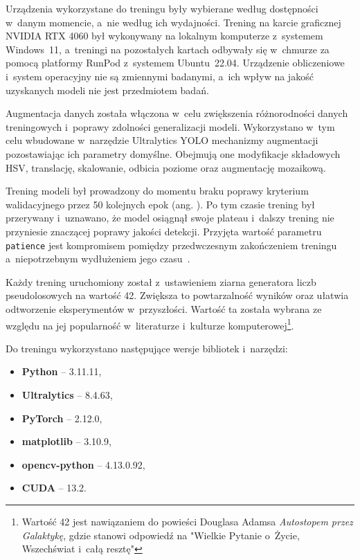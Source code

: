 Urządzenia wykorzystane do treningu były wybierane według dostępności w~danym momencie, a~nie według ich wydajności. Trening na karcie graficznej NVIDIA RTX 4060 był wykonywany na lokalnym komputerze z~systemem Windows~11, a~treningi na pozostałych kartach odbywały się w~chmurze za pomocą platformy RunPod z~systemem Ubuntu~22.04. Urządzenie obliczeniowe i~system operacyjny nie są zmiennymi badanymi, a~ich wpływ na jakość uzyskanych modeli nie jest przedmiotem badań.

Augmentacja danych została włączona w~celu zwiększenia różnorodności danych treningowych i~poprawy zdolności generalizacji modeli. Wykorzystano w~tym celu wbudowane w~narzędzie Ultralytics YOLO mechanizmy augmentacji pozostawiając ich parametry domyślne. Obejmują one modyfikacje składowych HSV, translację, skalowanie, odbicia poziome oraz augmentację mozaikową.

Trening modeli był prowadzony do momentu braku poprawy kryterium walidacyjnego przez 50 kolejnych epok (ang. ). Po tym czasie trening był przerywany i~uznawano, że model osiągnął swoje plateau i~dalszy trening nie przyniesie znaczącej poprawy jakości detekcji. Przyjęta wartość parametru \texttt{patience} jest kompromisem pomiędzy przedwczesnym zakończeniem treningu a~niepotrzebnym wydłużeniem jego czasu~\cite{bib:Prechelt1998}.

Każdy trening uruchomiony został z~ustawieniem ziarna generatora liczb pseudolosowych na wartość 42. Zwiększa to powtarzalność wyników oraz ułatwia odtworzenie eksperymentów w~przyszłości. Wartość ta została wybrana ze względu na jej popularność w~literaturze i~kulturze komputerowej\footnote{Wartość 42 jest nawiązaniem do powieści Douglasa Adamsa \textit{Autostopem przez Galaktykę}, gdzie stanowi odpowiedź na  "Wielkie Pytanie o~Życie, Wszechświat i~całą resztę"}.

Do treningu wykorzystano następujące wersje bibliotek i~narzędzi:
\begin{itemize}
    \item \textbf{Python} -- 3.11.11,
    \item \textbf{Ultralytics} -- 8.4.63,
    \item \textbf{PyTorch} -- 2.12.0,
    \item \textbf{matplotlib} -- 3.10.9,
    \item \textbf{opencv-python} -- 4.13.0.92,
    \item \textbf{CUDA} -- 13.2.
\end{itemize}

